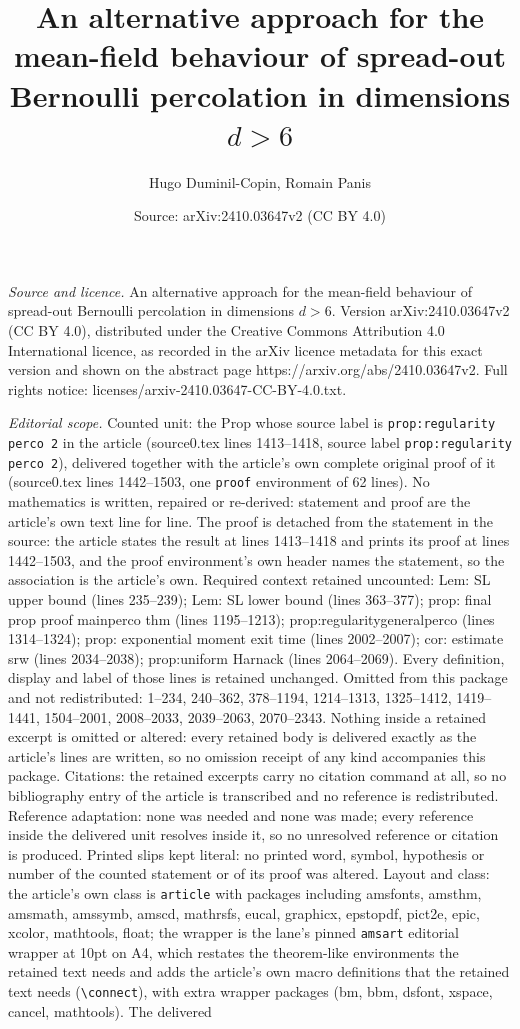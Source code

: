 \documentclass[10pt,a4paper]{amsart}
\title[An alternative approach for the mean-field behaviour of spre]{An alternative approach for the mean-field behaviour of spread-out Bernoulli percolation in dimensions $d>6$}
\author{Hugo Duminil-Copin, Romain Panis}
\date{Source: arXiv:2410.03647v2 (CC BY 4.0)}
\begin{document}
\maketitle

\noindent\emph{Source and licence.} An alternative approach for the mean-field behaviour of spread-out Bernoulli percolation in dimensions $d>6$. Version arXiv:2410.03647v2 (CC BY 4.0), distributed under the Creative Commons Attribution 4.0 International licence, as recorded in the arXiv licence metadata for this exact version and shown on the abstract page https://arxiv.org/abs/2410.03647v2. Full rights notice: licenses/arxiv-2410.03647-CC-BY-4.0.txt.\par\smallskip

\noindent\textit{Editorial scope.} Counted unit: the Prop whose source label is \texttt{prop:regularity perco 2} in the article (source0.tex lines 1413--1418, source label \texttt{prop:regularity perco 2}), delivered together with the article's own complete original proof of it (source0.tex lines 1442--1503, one \texttt{proof} environment of 62 lines). No mathematics is written, repaired or re-derived: statement and proof are the article's own text line for line. The proof is detached from the statement in the source: the article states the result at lines 1413--1418 and prints its proof at lines 1442--1503, and the proof environment's own header names the statement, so the association is the article's own. Required context retained uncounted: Lem: SL upper bound (lines 235--239); Lem: SL lower bound (lines 363--377); prop: final prop proof mainperco thm (lines 1195--1213); prop:regularitygeneralperco (lines 1314--1324); prop: exponential moment exit time (lines 2002--2007); cor: estimate srw (lines 2034--2038); prop:uniform Harnack (lines 2064--2069). Every definition, display and label of those lines is retained unchanged. Omitted from this package and not redistributed: 1--234, 240--362, 378--1194, 1214--1313, 1325--1412, 1419--1441, 1504--2001, 2008--2033, 2039--2063, 2070--2343. Nothing inside a retained excerpt is omitted or altered: every retained body is delivered exactly as the article's lines are written, so no omission receipt of any kind accompanies this package. Citations: the retained excerpts carry no citation command at all, so no bibliography entry of the article is transcribed and no reference is redistributed. Reference adaptation: none was needed and none was made; every reference inside the delivered unit resolves inside it, so no unresolved reference or citation is produced. Printed slips kept literal: no printed word, symbol, hypothesis or number of the counted statement or of its proof was altered. Layout and class: the article's own class is \texttt{article} with packages including amsfonts, amsthm, amsmath, amssymb, amscd, mathrsfs, eucal, graphicx, epstopdf, pict2e, epic, xcolor, mathtools, float; the wrapper is the lane's pinned \texttt{amsart} editorial wrapper at 10pt on A4, which restates the theorem-like environments the retained text needs and adds the article's own macro definitions that the retained text needs (\texttt{\textbackslash connect}), with extra wrapper packages (bm, bbm, dsfont, xspace, cancel, mathtools). The delivered 
\end{document}
